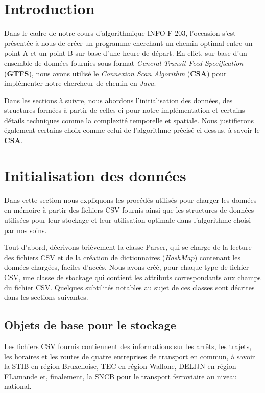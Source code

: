 \documentclass[12pt]{article}
\begin{document}
\clearpage


\tableofcontents

\newpage


\section{Introduction}
Dans le cadre de notre cours d'algorithmique INFO F-203, l'occasion s'est présentée à nous de créer un programme cherchant un chemin optimal
entre un point A et un point B sur base d'une heure de départ. En effet, sur base d'un ensemble de données
fournies sous format \emph{General Transit Feed Specification} (\textbf{GTFS}), nous avons utilisé le \emph{Connexion Scan Algorithm} (\textbf{CSA})
pour implémenter notre chercheur de chemin en \emph{Java}. 

Dans les sections à suivre, nous abordons l'initialisation des données, des structures formées à partir de celles-ci pour notre
implémentation et certains détails techniques comme la complexité temporelle et spatiale. Nous justifierons également certains choix
comme celui de l'algorithme précisé ci-dessus, à savoir le \textbf{CSA}.


\section{Initialisation des données}
\label{sec:init}
Dans cette section nous expliquons les procédés utilisés pour charger les données en mémoire à partir des fichiers CSV fournis ainsi que
les structures de données utilisées pour leur stockage et leur utilisation optimale dans l'algorithme choisi par nos soins.

Tout d'abord, décrivons brièvement la classe Parser, qui se charge de la lecture des fichiers CSV et de la création de dictionnaires (\emph{HashMap}) contenant les données chargées, faciles d'accès.
Nous avons créé, pour chaque type de fichier CSV, une classe de stockage qui contient les attributs correspondants aux champs du fichier CSV. Quelques subtilités notables au sujet de ces classes sont
décrites dans les sections suivantes.

\subsection{Objets de base pour le stockage}
Les fichiers CSV fournis contiennent des informations sur les arrêts, les trajets, les horaires et les routes de quatre entreprises de transport en commun,
à savoir la STIB en région Bruxelloise, TEC en région Wallone, DELIJN en région FLamande et, finalement, la SNCB pour le transport ferroviaire au niveau national.
\end{document}
